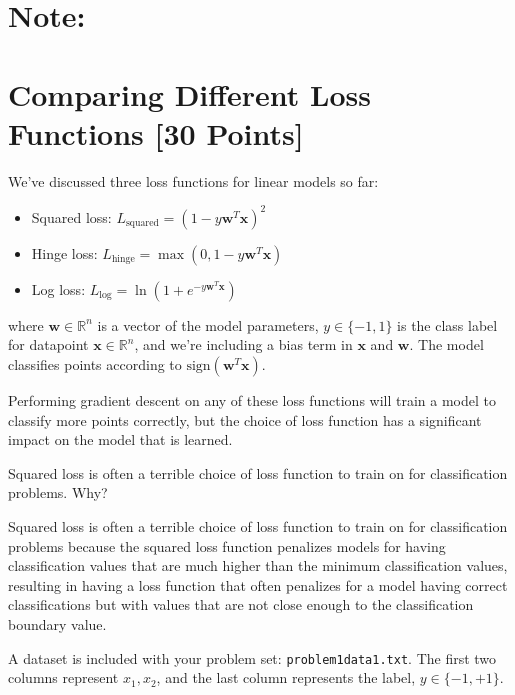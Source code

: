 
\newpage
\section*{Note: }
\section{Comparing Different Loss Functions [30 Points]}

We've discussed three loss functions for linear models so far:
\begin{itemize}
\item Squared loss: $L_\text{squared} = (1 - y\mathbf{w}^T\mathbf{x})^2$
\item Hinge loss: $L_\text{hinge} = \max(0, 1 - y\mathbf{w}^T\mathbf{x})$
\item Log loss: $L_\text{log} = \ln(1 + e^{-y\mathbf{w}^T\mathbf{x}})$
\end{itemize}
where $\mathbf{w} \in \mathbb{R}^n$ is a vector of the model parameters, $y \in \{-1,1\}$ is the class label for datapoint $\mathbf{x} \in \mathbb{R}^n$, and we're including a bias term in $\mathbf{x}$ and $\mathbf{w}$.  The model classifies points according to $\text{sign}(\mathbf{w}^T\mathbf{x})$.

Performing gradient descent on any of these loss functions will train a model to classify more points correctly, but the choice of loss function has a significant impact on the model that is learned.

\problem[3]
Squared loss is often a terrible choice of loss function to train on for classification problems.  Why?

Squared loss is often a terrible choice of loss function to train on for classification problems because the squared loss function penalizes models for having classification values that are much higher than the minimum classification values, resulting in having a loss function that often penalizes for a model having correct classifications but with values that are not close enough to the classification boundary value.

\problem[9]
A dataset is included with your problem set: \texttt{problem1data1.txt}. The first two columns represent $x_1, x_2$, and the last column represents the label, $y \in \{-1,+1\}$.

